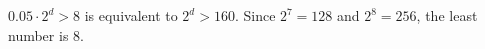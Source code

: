 $0.05\cdot2^d>8$ is equivalent to $2^d>160$. Since $2^7=128$ and $2^8=256$, the least number is $\boxed8$.
